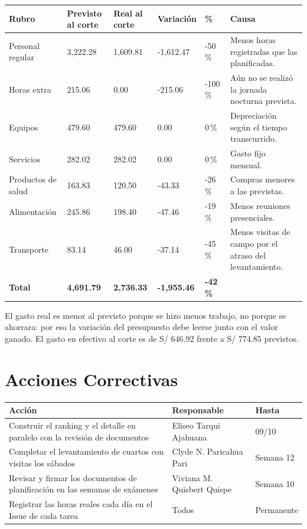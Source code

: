 \documentclass[11pt,a4paper]{article}
\begin{document}
\vspace{0.1cm}
{\footnotesize
\setlength{\tabcolsep}{3.5pt}
\noindent\begin{tabularx}{\textwidth}{@{}P{2.7cm} Q{1.6cm} Q{1.6cm} Q{1.5cm} Q{1.1cm} L@{}}
\toprule
{}
\textbf{Rubro} & \textbf{Previsto al corte} & \textbf{Real al corte} & \textbf{Variación} & \textbf{\%} & \textbf{Causa} \\
\midrule
Personal regular & 3,222.28 & 1,609.81 & -1,612.47 & -50\,\% & Menos horas registradas que las planificadas. \\
Horas extra & 215.06 & 0.00 & -215.06 & -100\,\% & Aún no se realizó la jornada nocturna prevista. \\
Equipos & 479.60 & 479.60 & 0.00 & 0\,\% & Depreciación según el tiempo transcurrido. \\
Servicios & 282.02 & 282.02 & 0.00 & 0\,\% & Gasto fijo mensual. \\
Productos de salud & 163.83 & 120.50 & -43.33 & -26\,\% & Compras menores a las previstas. \\
Alimentación & 245.86 & 198.40 & -47.46 & -19\,\% & Menos reuniones presenciales. \\
Transporte & 83.14 & 46.00 & -37.14 & -45\,\% & Menos visitas de campo por el atraso del levantamiento. \\
\midrule
{}\textbf{Total} & \textbf{4,691.79} & \textbf{2,736.33} & \textbf{-1,955.46} & \textbf{-42\,\%} & \\
\bottomrule
\end{tabularx}
}

\vspace{0.15cm}
\noindent El gasto real es menor al previsto porque se hizo menos trabajo, no porque se ahorrara: por eso la variación del presupuesto debe leerse junto con el valor ganado. El gasto en efectivo al corte es de S/ 646.92 frente a S/ 774.85 previstos.

\section{Acciones Correctivas}
{\small
{}
\noindent\begin{tabularx}{\textwidth}{@{}L P{3.4cm} C{1.6cm}@{}}
\toprule
{}
\textbf{Acción} & \textbf{Responsable} & \textbf{Hasta} \\
\midrule
Construir el ranking y el detalle en paralelo con la revisión de documentos & Eliseo Tarqui Ajahuana & 09/10 \\
Completar el levantamiento de cuartos con visitas los sábados & Clyde N. Paricahua Pari & Semana 12 \\
Revisar y firmar los documentos de planificación en las semanas de exámenes & Viviana M. Quisbert Quispe & Semana 10 \\
Registrar las horas reales cada día en el Issue de cada tarea & Todos & Permanente \\
\bottomrule
\end{tabularx}
}
\end{document}
